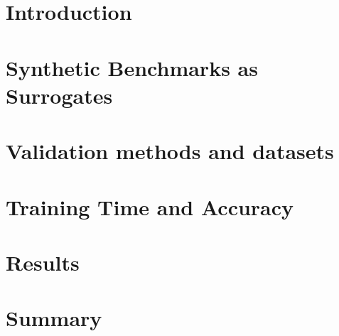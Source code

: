 \section{Introduction}


\section{Synthetic Benchmarks as Surrogates}


\section{Validation methods and datasets}

\section{Training Time and Accuracy}

\section{Results}

\section{Summary}
